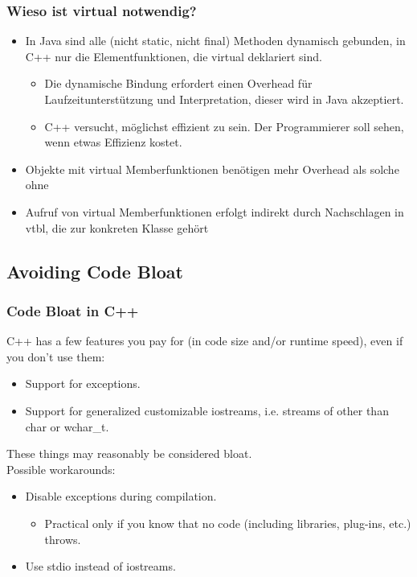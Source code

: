 \subsubsection{Wieso ist virtual notwendig?}
\begin{itemize}
  \item In Java sind alle (nicht static, nicht final) Methoden dynamisch gebunden, in C++ nur die Elementfunktionen, die virtual deklariert sind.
  \begin{itemize}
    \item Die dynamische Bindung erfordert einen Overhead für Laufzeitunterstützung und Interpretation, dieser wird in Java akzeptiert.
    \item C++ versucht, möglichst effizient zu sein. Der Programmierer soll sehen, wenn etwas Effizienz kostet.
  \end{itemize}
  \item Objekte mit virtual Memberfunktionen benötigen mehr Overhead als solche ohne
  \item Aufruf von virtual Memberfunktionen erfolgt indirekt durch Nachschlagen in vtbl, die zur konkreten Klasse gehört
\end{itemize}

\subsection{Avoiding Code Bloat}
\subsubsection{Code Bloat in C++}
C++ has a few features you pay for (in code size and/or runtime speed), even if you don't use them:
\begin{itemize}
  \item Support for exceptions.
  \item Support for generalized customizable iostreams, i.e. streams of other than char or wchar\_t.
\end{itemize}
These things may reasonably be considered bloat.\\
Possible workarounds:
\begin{itemize}
  \item Disable exceptions during compilation.
  \begin{itemize}
    \item Practical only if you know that no code (including libraries, plug-ins, etc.) throws.
  \end{itemize}
  \item Use stdio instead of iostreams.
\end{itemize}

